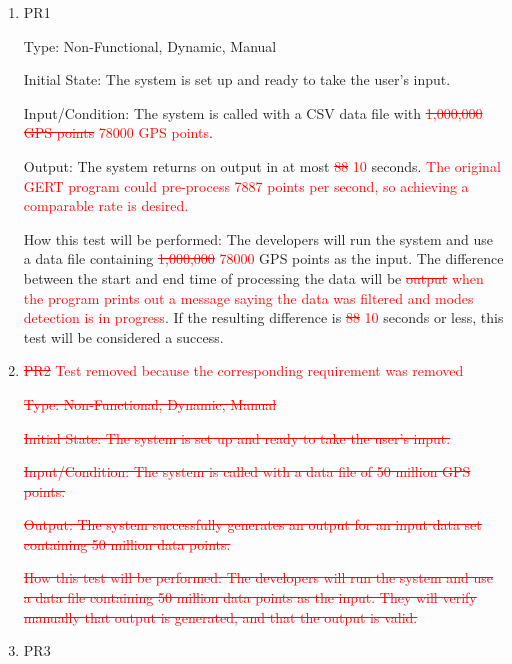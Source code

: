 \documentclass[12pt, titlepage]{article}
\begin{document}
\begin{enumerate}

\item{PR1\\}\label{PR1}

Type: Non-Functional, Dynamic, Manual
					
Initial State: 
The system is set up and ready to take the user's input.

Input/Condition: 
The system is called with a CSV data file with \textcolor{red}{\sout{1,000,000 GPS points} 78000 GPS points}.

Output: 
The system returns on output in at most \textcolor{red}{\sout{88} 10} seconds. \textcolor{red}{The original GERT program could pre-process 7887 points per second, so achieving a comparable rate is desired.}

How this test will be performed:
The developers will run the system and use a data file containing \textcolor{red}{\sout{1,000,000} 78000} GPS points as the input. The difference between the start and end time of processing the data will be \textcolor{red}{\sout{output} when the program prints out a message saying the data was filtered and modes detection is in progress}. If the resulting difference is \textcolor{red}{\sout{88} 10} seconds or less, this test will be considered a success.  
\\
\item{\textcolor{red}{\sout{PR2} Test removed because the corresponding requirement was removed}\\}\label{PR2}

\textcolor{red}{\sout{Type: Non-Functional, Dynamic, Manual}}
					
\textcolor{red}{\sout{Initial State: 
The system is set up and ready to take the user's input.}}

\textcolor{red}{\sout{Input/Condition: 
The system is called with a data file of 50 million GPS points.}}

\textcolor{red}{\sout{Output: 
The system successfully generates an output for an input data set containing 50 million data points.}}

\textcolor{red}{\sout{How this test will be performed: The developers will run the system and use a data file containing 50 million data points as the input. They will verify manually that output is generated, and that the output is valid.}}
\\
\item{PR3\\}\label{PR3}


\end{enumerate}
\end{document}
